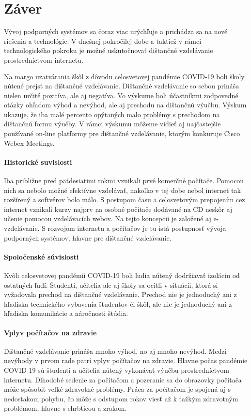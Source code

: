 \documentclass[10pt,oneside,slovak,a4paper]{article}
\begin{document}
\section*{Záver}
Vývoj podporných systémov sa čoraz viac urýchľuje a prichádza sa na nové riešenia a technológie.
V dnešnej pokročilej dobe a taktiež v rámci technologického pokroku je možné uskutočnovať dištančné vzdelávanie prostredníctvom internetu.

Na margo uzatvárania škôl z dôvodu celosvetovej pandémie COVID-19 boli školy nútené prejsť na dištančné vzdelávanie.
Dištančné vzdelávanie so sebou prináša nielen určité pozitíva, ale aj negatíva. 
Vo výskume boli účastníkmi zodpovedné otázky ohľadom výhod a nevýhod, ale aj prechodu na dištančnú výučbu.
Výskum ukazuje, že iba malé percento opýtaných malo problémy s prechodom na dištančnú formu výučby.
V rámci výskumu môžeme vidieť aj najčastejšie používané on-line platformy pre dištančné vzdelávanie, ktorým konkuruje Cisco Webex Meetings.

\paragraph{Historické suvislosti}
Iba približne pred päťdesiatimi rokmi vznikali prvé komerčné počítače.
Pomocou nich sa nebolo možné efektívne vzdelávať, nakoľko v tej dobe nebol internet tak rozšírený a softvérov bolo málo.
S postupom času a celosvetovým prepojením cez internet vznikali kurzy najprv na osobné počítače dodávané na CD neskôr aj učenie pomocou vzdelávacích webov.
Na tejto koncepcii je založené aj e-vzdelávanie. S rozvojom internetu a počítačov je tu istá postupnosť vývoja podporných systémov, hlavne pre dištančné vzdelávanie.

\paragraph{Spoločenské súvislosti}
Kvôli celosvetovej pandémii COVID-19 boli ľudia nútený dodržiavať izoláciu od ostatných ľuďí.
Študenti, učitelia ale aj školy sa ocitli v situácii, ktorá si vyžadovala prechod na dištančné vzdelávanie.
Prechod nie je jednoduchý ani z hľadiska technického vybavenia študentov či škôl, ale nie je jednoduchý ani z hľadiska komunikácie a náročnosti štúdia. 

\paragraph{Vplyv počítačov na zdravie}
Dištančné vzdelávanie prináša mnoho výhod, no aj mnoho nevýhod. Medzi nevýhody v prvom rade patrí vplyv počítačov na zdravie.
Hlavne počas pandémie COVID-19 sú študenti a učitelia nútený vykonávať výučbu prostredníctvom internetu.
Dlhodobé sedenie za počítačom a pozeranie sa do obrazovky počítača môže spôsobiť veľké zdravotné problémy.
Práca za počítačom je spojená aj s nedostakom pohybu, čo môže s odstupom rokov viesť až k ťažkým zdravotným problémom, hlavne s chrbticou a zrakom.




\end{document}
